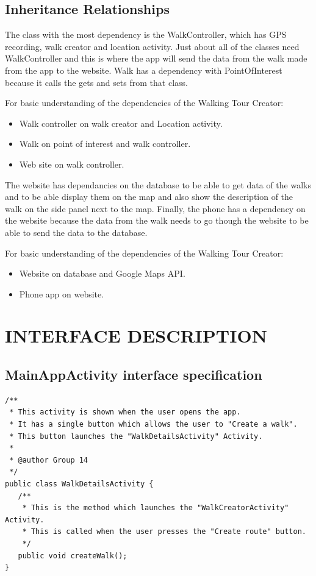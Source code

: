 \documentclass{project}
\begin{document}
\newpage

\subsection{Inheritance Relationships}
The class with the most dependency is the WalkController, which has GPS
recording, walk creator and location activity. Just about all of the classes
need WalkController and this is where the app will send the data from the walk
made from the app to the website. Walk has a dependency with PointOfInterest
because it calls the gets and sets from that class. 

For basic understanding of the dependencies of the Walking Tour Creator:
\begin{itemize}
\item Walk controller on walk creator and Location activity.
\item Walk on point of interest and walk controller.
\item Web site on walk controller.
\end{itemize}

The website has dependancies on the database to be able to get data of the
walks and to be able display them on the map and also show the description of
the walk on the side panel next to the map. Finally, the phone has a dependency
on the website because the data from the walk needs to go though the website to
be able to send the data to the database.      

For basic understanding of the dependencies of the Walking Tour Creator:
\begin{itemize}
\item Website on database and Google Maps API.
\item Phone app on website. 
\end{itemize}

\newpage

\section{INTERFACE DESCRIPTION}
\subsection{MainAppActivity interface specification}
\begin{verbatim}/**
 * This activity is shown when the user opens the app.
 * It has a single button which allows the user to "Create a walk". 
 * This button launches the "WalkDetailsActivity" Activity.
 *
 * @author Group 14
 */
public class WalkDetailsActivity {
   /**
    * This is the method which launches the "WalkCreatorActivity" Activity.
    * This is called when the user presses the "Create route" button.
    */
   public void createWalk();
}\end{verbatim}
\end{document}
